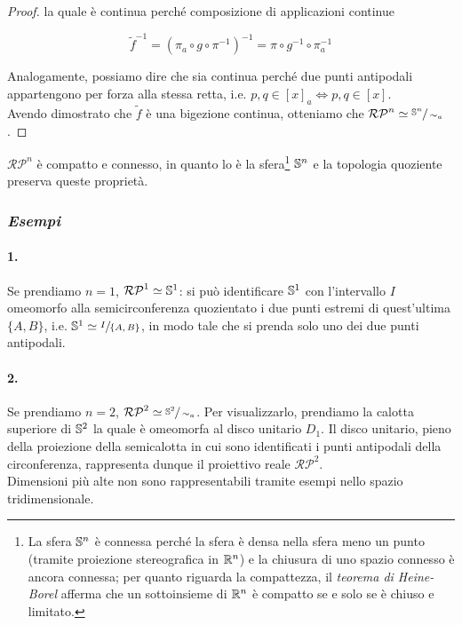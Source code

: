 \begin{proof}
	la quale è continua perché composizione di applicazioni continue
	
	\begin{equation}
		\tilde{f}^{-1} = (\pi_{a} \circ g \circ \pi^{-1})^{-1} = \pi \circ g^{-1} \circ \pi_{a}^{-1}
	\end{equation}

	Analogamente, possiamo dire che sia continua perché due punti antipodali appartengono per forza alla stessa retta, i.e. $ p,q \in [x]_{a} \iff p,q \in [x] $.\\
	Avendo dimostrato che $ \tilde{f} $ è una bigezione continua, otteniamo che $ \mathcal{RP}^{n} \simeq \sfrac{\S^{n}}{\sim_{a}} $.
\end{proof}

\begin{corollary}
	$ \mathcal{RP}^{n} $ è compatto e connesso, in quanto lo è la sfera\footnote{%
		La sfera $ \S^{n} $ è connessa perché la sfera è densa nella sfera meno un punto (tramite proiezione stereografica in $ \R^{n} $) e la chiusura di uno spazio connesso è ancora connessa; per quanto riguarda la compattezza, il \textit{teorema di Heine-Borel} afferma che un sottoinsieme di $ \R^{n} $ è compatto se e solo se è chiuso e limitato.%
	} $ \S^{n} $ e la topologia quoziente preserva queste proprietà.
\end{corollary}

\subsubsection{\textit{Esempi}}

\paragraph{1.}

Se prendiamo $ n=1 $, $ \mathcal{RP}^{1} \simeq \S^{1} $: si può identificare $ \S^{1} $ con l'intervallo $ I $ omeomorfo alla semicirconferenza quozientato i due punti estremi di quest'ultima $ \{A,B\} $, i.e. $ \S^{1} \simeq \sfrac{I}{\{A,B\}} $, in modo tale che si prenda solo uno dei due punti antipodali.

\paragraph{2.}

Se prendiamo $ n=2 $, $ \mathcal{RP}^{2} \simeq \sfrac{\S^{2}}{\sim_{a}} $. Per visualizzarlo, prendiamo la calotta superiore di $ \S^{2} $ la quale è omeomorfa al disco unitario $ D_{1} $. Il disco unitario, pieno della proiezione della semicalotta in cui sono identificati i punti antipodali della circonferenza, rappresenta dunque il proiettivo reale $ \mathcal{RP}^{2} $.\\
Dimensioni più alte non sono rappresentabili tramite esempi nello spazio tridimensionale.

